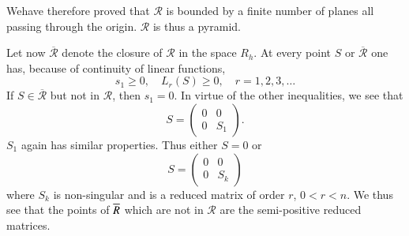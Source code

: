 We\pageoriginale have therefore proved that $\mathscr{R}$ is bounded
by a finite number of planes all passing through the
origin. $\mathscr{R}$ is thus a pyramid.

Let now $\overline{\mathscr{R}}$ denote the closure of $\mathscr{R}$
in the space $R_{h}$. At every point $S$ or $\overline{\mathscr{R}}$
one has, because of continuity of linear functions,
$$
s_{1}\geq 0,\quad L_{r}(S)\geq 0,\quad r=1,2,3,\ldots
$$
If $S\in \overline{\mathscr{R}}$ but not in $\mathscr{R}$, then
$s_{1}=0$. In virtue of the other inequalities, we see that
$$
S=
\begin{pmatrix}
0 & 0\\
0 & S_{1}
\end{pmatrix}.
$$
$S_{1}$ again has similar properties. Thus either $S=0$ or
$$
S=
\begin{pmatrix}
0 & 0\\
0 & S_{k}
\end{pmatrix}
$$
where $S_{k}$ is non-singular and is a reduced matrix of order $r$,
$0<r<n$. We thus see that the points of $\overline{R}$ which are not in
$\mathscr{R}$ are the semi-positive reduced matrices.

